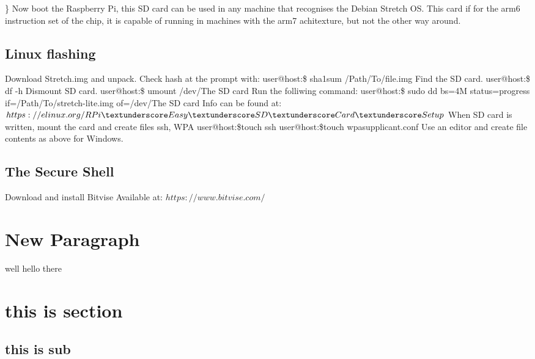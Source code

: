 \documentclass[a4paper,12pt]{article}
\begin{document}
\}
\newline\newline
Now boot the Raspberry Pi, this SD card can be used in any machine that recognises the Debian Stretch OS.
\newline
This card if for the arm6 instruction set of the chip, it is capable of running in machines with the arm7 achitexture, but not the other way around. 
\subsection{Linux flashing}
Download Stretch.img and unpack.
\newline
\newline
Check hash at the prompt with:
\newline
user@host:\raisebox{-1ex}{\textasciitilde}\$ sha1sum /Path/To/file.img
\newline
\newline
Find the SD card.
\newline
user@host:\raisebox{-0.9ex}{\textasciitilde}\$ df -h
\newline
\newline
Dismount SD card.
\newline
user@host:\raisebox{-0.9ex}{\textasciitilde}\$ umount /dev/The SD card
\newline
\newline
Run the folliwing command:
\newline
user@host:\raisebox{-0.9ex}{\textasciitilde}\$ sudo dd bs=4M status=progress if=\raisebox{-1ex}{\textasciitilde}/Path/To/stretch-lite.img  of=/dev/The SD card
\newline
\newline
Info can be found at:
\newline
$https://elinux.org/RPi\textunderscore Easy\textunderscore SD\textunderscore Card\textunderscore Setup$
\newline
\newline
When SD card is written, mount the card and create files ssh, WPA
\newline
user@host:\raisebox{-0.9ex}{\textasciitilde}\$touch ssh
\newline
user@host:\raisebox{-0.9ex}{\textasciitilde}\$touch wpa\textunderscore supplicant.conf
\newline
\newline
Use an editor and create file contents as above for Windows.
\subsection{The Secure Shell}
Download and install Bitvise
Available at:
\newline
$https://www.bitvise.com/$
\section{New Paragraph}
well hello there
\pagebreak
\section{this is section}
\subsection{this is sub}
\end{document}
